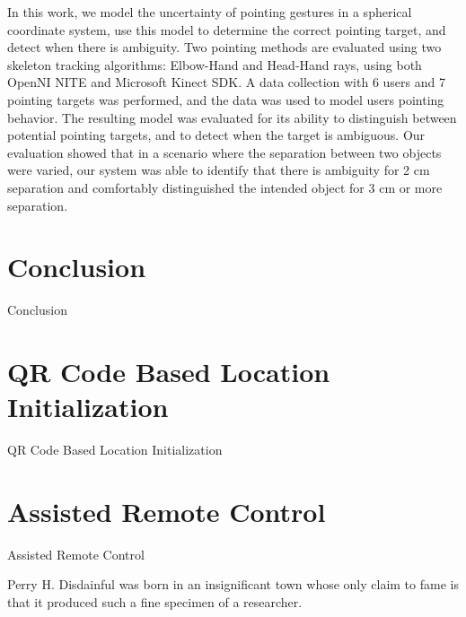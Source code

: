 \documentclass[12pt]{gatech-thesis}
\begin{document}
In this work, we model the uncertainty of pointing gestures in a spherical coordinate system, use this model to determine the correct pointing target, and detect when there is ambiguity. Two pointing methods are evaluated using two skeleton tracking algorithms: Elbow-Hand and Head-Hand rays, using both OpenNI NITE and Microsoft Kinect SDK.  A data collection with 6 users and 7 pointing targets was performed, and the data was used to model users pointing behavior.  The resulting model was evaluated for its ability to distinguish between potential pointing targets, and to detect when the target is ambiguous. Our evaluation showed that in a scenario where the separation between two objects were varied, our system was able to identify that there is ambiguity for 2 cm separation and comfortably distinguished the intended object for 3 cm or more separation.













\chapter{Conclusion}
\label{chapter:conclusion}

Conclusion

\appendix
\chapter{QR Code Based Location Initialization}
\label{chapter:qr_code_based_location_initialization}

QR Code Based Location Initialization

\chapter{Assisted Remote Control}
\label{chapter:assisted_remote_control}

Assisted Remote Control







\begin{postliminary}
{}
\begin{vita}
Perry H. Disdainful was born in an insignificant town
whose only claim to fame is that it produced such a fine
specimen of a researcher.
\end{vita}
\end{postliminary}
\end{document}
